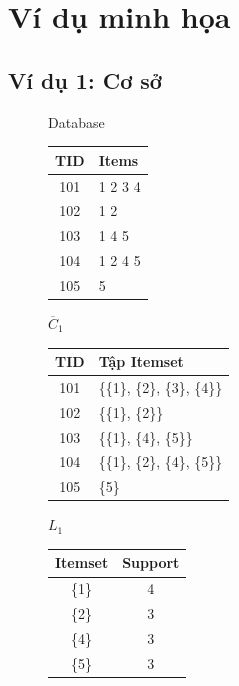 \documentclass[12pt]{article}
\begin{document}
\section{Ví dụ minh họa}
\label{sec: example}

\subsection{Ví dụ 1: Cơ sở}

\begin{figure}[htbp]
    \centering
    \renewcommand{\arraystretch}{1.2} %

    \begin{minipage}[t]{0.22\textwidth}
        \centering
        Database\\[4pt]
        \begin{tabular}{|c|l|}
        \hline
        TID & Items \\ \hline
        101 & 1 2 3 4 \\
        102 & 1 2 \\
        103 & 1 4 5 \\
        104 & 1 2 4 5 \\
        105 & 5 \\ \hline
        \end{tabular}
    \end{minipage}
    \hfill
    \begin{minipage}[t]{0.45\textwidth}
        \centering
        $\overline{C}_1$\\[4pt]
        \begin{tabular}{|c|l|}
        \hline
        TID & Tập Itemset \\ \hline
        101 & \{\{1\}, \{2\}, \{3\}, \{4\}\} \\
        102 & \{\{1\}, \{2\}\} \\
        103 & \{\{1\}, \{4\}, \{5\}\} \\
        104 & \{\{1\}, \{2\}, \{4\}, \{5\}\} \\
        105 & \{5\} \\ \hline
        \end{tabular}
    \end{minipage}
    \hfill
    \begin{minipage}[t]{0.25\textwidth}
        \centering
        $L_1$\\[4pt]
        \begin{tabular}{|c|c|}
        \hline
        Itemset & Support \\ \hline
        \{1\} & 4 \\
        \{2\} & 3 \\
        \{4\} & 3 \\
        \{5\} & 3 \\ \hline
        \end{tabular}
    \end{minipage}


\end{figure}
\end{document}
